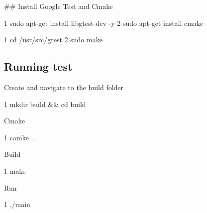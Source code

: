 \#\# Install Google Test and Cmake 
\begin{DoxyCode}
1 sudo apt-get install libgtest-dev -y
2 sudo apt-get install cmake
\end{DoxyCode}
 
\begin{DoxyCode}
1 cd /usr/src/gtest
2 sudo make
\end{DoxyCode}


\subsection*{Running test}

Create and navigate to the build folder 
\begin{DoxyCode}
1 mkdir build && cd build
\end{DoxyCode}


Cmake 
\begin{DoxyCode}
1 camke ..
\end{DoxyCode}


Build 
\begin{DoxyCode}
1 make
\end{DoxyCode}


Run 
\begin{DoxyCode}
1 ./main
\end{DoxyCode}
 